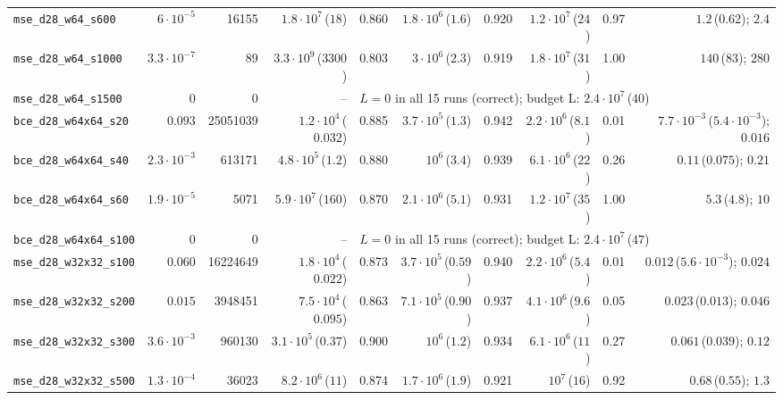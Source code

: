 \begin{tabular}{lrrrrrrrrr}
\texttt{mse\_d28\_w64\_s600} & $6\cdot10^{-5}$ & 16155 & $1.8\cdot10^{7}$\,($18$) & 0.860 & $1.8\cdot10^{6}$\,($1.6$) & 0.920 & $1.2\cdot10^{7}$\,($24$) & 0.97 & $1.2$\,($0.62$); $2.4$\\
\texttt{mse\_d28\_w64\_s1000} & $3.3\cdot10^{-7}$ & 89 & $3.3\cdot10^{9}$\,($3300$) & 0.803 & $3\cdot10^{6}$\,($2.3$) & 0.919 & $1.8\cdot10^{7}$\,($31$) & 1.00 & $140$\,($83$); $280$\\
\texttt{mse\_d28\_w64\_s1500} & 0 & 0 & -- & \multicolumn{6}{l}{$L=0$ in all 15 runs (correct); budget L: $2.4\cdot10^{7}$\,($40$)}\\
\texttt{bce\_d28\_w64x64\_s20} & $0.093$ & 25051039 & $1.2\cdot10^{4}$\,($0.032$) & 0.885 & $3.7\cdot10^{5}$\,($1.3$) & 0.942 & $2.2\cdot10^{6}$\,($8.1$) & 0.01 & $7.7\cdot10^{-3}$\,($5.4\cdot10^{-3}$); $0.016$\\
\texttt{bce\_d28\_w64x64\_s40} & $2.3\cdot10^{-3}$ & 613171 & $4.8\cdot10^{5}$\,($1.2$) & 0.880 & $10^{6}$\,($3.4$) & 0.939 & $6.1\cdot10^{6}$\,($22$) & 0.26 & $0.11$\,($0.075$); $0.21$\\
\texttt{bce\_d28\_w64x64\_s60} & $1.9\cdot10^{-5}$ & 5071 & $5.9\cdot10^{7}$\,($160$) & 0.870 & $2.1\cdot10^{6}$\,($5.1$) & 0.931 & $1.2\cdot10^{7}$\,($35$) & 1.00 & $5.3$\,($4.8$); $10$\\
\texttt{bce\_d28\_w64x64\_s100} & 0 & 0 & -- & \multicolumn{6}{l}{$L=0$ in all 15 runs (correct); budget L: $2.4\cdot10^{7}$\,($47$)}\\
\texttt{mse\_d28\_w32x32\_s100} & $0.060$ & 16224649 & $1.8\cdot10^{4}$\,($0.022$) & 0.873 & $3.7\cdot10^{5}$\,($0.59$) & 0.940 & $2.2\cdot10^{6}$\,($5.4$) & 0.01 & $0.012$\,($5.6\cdot10^{-3}$); $0.024$\\
\texttt{mse\_d28\_w32x32\_s200} & $0.015$ & 3948451 & $7.5\cdot10^{4}$\,($0.095$) & 0.863 & $7.1\cdot10^{5}$\,($0.90$) & 0.937 & $4.1\cdot10^{6}$\,($9.6$) & 0.05 & $0.023$\,($0.013$); $0.046$\\
\texttt{mse\_d28\_w32x32\_s300} & $3.6\cdot10^{-3}$ & 960130 & $3.1\cdot10^{5}$\,($0.37$) & 0.900 & $10^{6}$\,($1.2$) & 0.934 & $6.1\cdot10^{6}$\,($11$) & 0.27 & $0.061$\,($0.039$); $0.12$\\
\texttt{mse\_d28\_w32x32\_s500} & $1.3\cdot10^{-4}$ & 36023 & $8.2\cdot10^{6}$\,($11$) & 0.874 & $1.7\cdot10^{6}$\,($1.9$) & 0.921 & $10^{7}$\,($16$) & 0.92 & $0.68$\,($0.55$); $1.3$\\
\bottomrule
\end{tabular}
